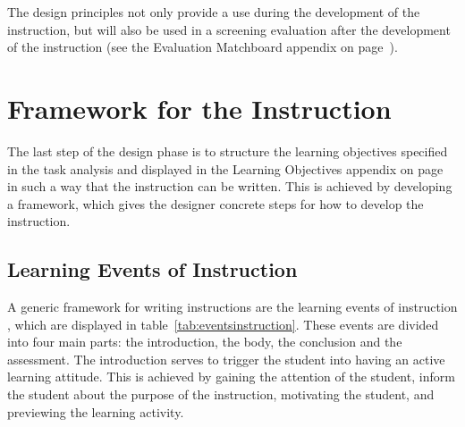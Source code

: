\documentclass[11pt,twoside]{report} %
\begin{document}
The design principles not only provide a use during the development of the instruction, but will also be used in a screening evaluation after the development of the instruction \cite{evamatchboard} (see the Evaluation Matchboard appendix on page~\pageref{app:evamatchboard}).

\chapter{Framework for the Instruction}

The last step of the design phase is to structure the learning objectives specified in the task analysis and displayed in the Learning Objectives appendix on page~\pageref{app:learningobjectives} in such a way that the instruction can be written. This is achieved by developing a framework, which gives the designer concrete steps for how to develop the instruction.

\section{Learning Events of Instruction}

A generic framework for writing instructions are the learning events of instruction \cite{smithragan}, which are displayed in table~\ref{tab:eventsinstruction}. These events are divided into four main parts: the introduction, the body, the conclusion and the assessment. The introduction serves to trigger the student into having an active learning attitude. This is achieved by gaining the attention of the student, inform the student about the purpose of the instruction, motivating the student, and previewing the learning activity.
\end{document}
